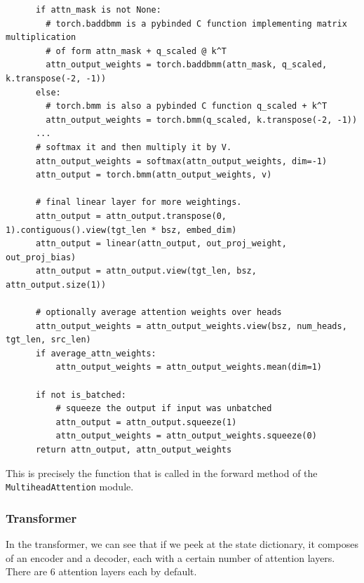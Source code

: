 \documentclass{article}
\begin{document}
\begin{lstlisting}
      if attn_mask is not None:
        # torch.baddbmm is a pybinded C function implementing matrix multiplication 
        # of form attn_mask + q_scaled @ k^T
        attn_output_weights = torch.baddbmm(attn_mask, q_scaled, k.transpose(-2, -1))
      else:
        # torch.bmm is also a pybinded C function q_scaled + k^T
        attn_output_weights = torch.bmm(q_scaled, k.transpose(-2, -1))
      ...
      # softmax it and then multiply it by V. 
      attn_output_weights = softmax(attn_output_weights, dim=-1)
      attn_output = torch.bmm(attn_output_weights, v)

      # final linear layer for more weightings. 
      attn_output = attn_output.transpose(0, 1).contiguous().view(tgt_len * bsz, embed_dim)
      attn_output = linear(attn_output, out_proj_weight, out_proj_bias)
      attn_output = attn_output.view(tgt_len, bsz, attn_output.size(1))

      # optionally average attention weights over heads
      attn_output_weights = attn_output_weights.view(bsz, num_heads, tgt_len, src_len)
      if average_attn_weights:
          attn_output_weights = attn_output_weights.mean(dim=1)

      if not is_batched:
          # squeeze the output if input was unbatched
          attn_output = attn_output.squeeze(1)
          attn_output_weights = attn_output_weights.squeeze(0)
      return attn_output, attn_output_weights
    \end{lstlisting}

    This is precisely the function that is called in the forward method of the \texttt{MultiheadAttention} module. 

  \subsubsection{Transformer}

    In the transformer, we can see that if we peek at the state dictionary, it composes of an encoder and a decoder, each with a certain number of attention layers. There are 6 attention layers each by default. 
\end{document}
